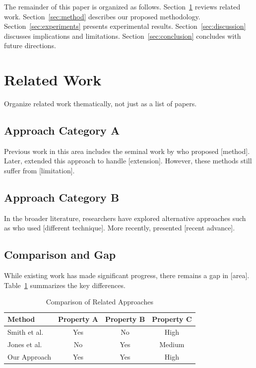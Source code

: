 \documentclass[conference]{IEEEtran}
\theoremstyle{plain}
\theoremstyle{definition}
\begin{document}
The remainder of this paper is organized as follows. Section~\ref{sec:related} 
reviews related work. Section~\ref{sec:method} describes our proposed methodology. 
Section~\ref{sec:experiments} presents experimental results. 
Section~\ref{sec:discussion} discusses implications and limitations. 
Section~\ref{sec:conclusion} concludes with future directions.

\section{Related Work}
\label{sec:related}

Organize related work thematically, not just as a list of papers.

\subsection{Approach Category A}

Previous work in this area includes the seminal work by \cite{author2020} who 
proposed [method]. Later, \cite{other2021} extended this approach to handle 
[extension]. However, these methods still suffer from [limitation].

\subsection{Approach Category B}

In the broader literature, researchers have explored alternative approaches 
such as \cite{diff2022} who used [different technique]. More recently, 
\cite{recent2023} presented [recent advance].

\subsection{Comparison and Gap}

While existing work has made significant progress, there remains a gap in 
[area]. Table~\ref{tab:comparison} summarizes the key differences.

\begin{table}[htbp]
\caption{Comparison of Related Approaches}
\label{tab:comparison}
\begin{center}
\begin{tabular}{|l|c|c|c|}
\hline
\textbf{Method} & \textbf{Property A} & \textbf{Property B} & \textbf{Property C} \\
\hline
Smith et al. \cite{smith2023} & Yes & No & High \\
Jones et al. \cite{jones2022} & No & Yes & Medium \\
Our Approach & Yes & Yes & High \\
\hline
\end{tabular}
\end{center}
\end{table}
\end{document}
